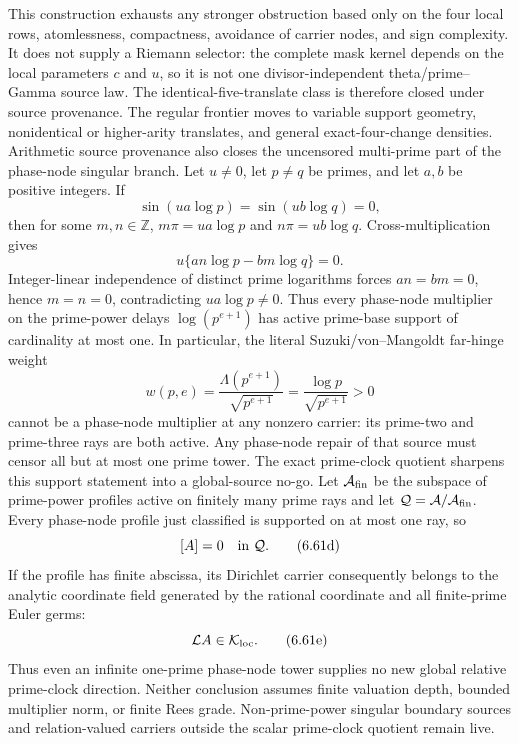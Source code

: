 \documentclass[11pt]{article}
\theoremstyle{definition}
\theoremstyle{remark}
\begin{document}
This construction exhausts any stronger obstruction based only on the four local rows,
atomlessness, compactness, avoidance of carrier nodes, and sign complexity.  It does not supply a
Riemann selector: the complete mask kernel depends on the local parameters $c$ and $u$, so it is
not one divisor-independent theta/prime--Gamma source law.  The identical-five-translate class is
therefore closed under source provenance.  The regular frontier moves to variable support
geometry, nonidentical or higher-arity translates, and general exact-four-change densities.
Arithmetic source provenance also closes the uncensored multi-prime part of the phase-node
singular branch.  Let $u\ne0$, let $p\ne q$ be primes, and let $a,b$ be positive integers.  If
\[
 \sin(ua\log p)=\sin(ub\log q)=0,                     \tag{6.61a}
\]
then for some $m,n\in\mathbb Z$,
$m\pi=ua\log p$ and $n\pi=ub\log q$.  Cross-multiplication gives
\[
 u\{an\log p-bm\log q\}=0.                            \tag{6.61b}
\]
Integer-linear independence of distinct prime logarithms forces $an=bm=0$, hence $m=n=0$,
contradicting $ua\log p\ne0$.  Thus every phase-node multiplier on the prime-power delays
$\log(p^{e+1})$ has active prime-base support of cardinality at most one.  In particular, the
literal Suzuki/von--Mangoldt far-hinge weight
\[
 w(p,e)=\frac{\Lambda(p^{e+1})}{\sqrt{p^{e+1}}}
       =\frac{\log p}{\sqrt{p^{e+1}}}>0               \tag{6.61c}
\]
cannot be a phase-node multiplier at any nonzero carrier: its prime-two and prime-three rays are
both active.  Any phase-node repair of that source must censor all but at most one prime tower.
The exact prime-clock quotient sharpens this support statement into a global-source no-go.  Let
$\mathcal A_{\rm fin}$ be the subspace of prime-power profiles active on finitely many prime rays
and let $\mathcal Q=\mathcal A/\mathcal A_{\rm fin}$.  Every phase-node profile just classified is
supported on at most one ray, so
\[
 [A]=0\quad\hbox{in }\mathcal Q.                         \tag{6.61d}
\]
If the profile has finite abscissa, its Dirichlet carrier consequently belongs to the analytic
coordinate field generated by the rational coordinate and all finite-prime Euler germs:
\[
 \mathcal L A\in\mathcal K_{\rm loc}.                    \tag{6.61e}
\]
Thus even an infinite one-prime phase-node tower supplies no new global relative prime-clock
direction.  Neither conclusion assumes finite valuation depth, bounded multiplier norm, or finite
Rees grade.  Non-prime-power singular boundary sources and relation-valued carriers outside the
scalar prime-clock quotient remain live.
\end{document}
